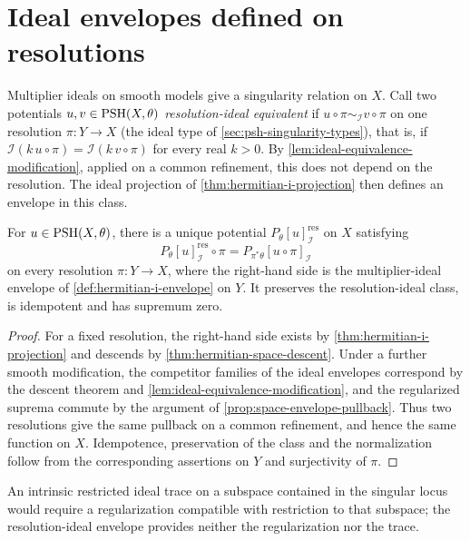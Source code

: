 \section{Ideal envelopes defined on resolutions}

Multiplier ideals on smooth models give a singularity relation on $X$. Call two potentials $u,v\in\mathrm{PSH}(X,\theta)$ \emph{resolution-ideal equivalent} if $u\circ\pi\sim_{\mathcal I}v\circ\pi$ on one resolution $\pi\colon Y\to X$ (the ideal type of \cref{sec:psh-singularity-types}), that is, if $\mathcal I(k\,u\circ\pi)=\mathcal I(k\,v\circ\pi)$ for every real $k>0$. By \cref{lem:ideal-equivalence-modification}, applied on a common refinement, this does not depend on the resolution. The ideal projection of \cref{thm:hermitian-i-projection} then defines an envelope in this class.

\begin{proposition}\label{prop:space-resolution-i-envelope}
For $u\in\mathrm{PSH}(X,\theta)$, there is a unique potential $P_\theta[u]_{\mathcal I}^{\mathrm{res}}$ on $X$ satisfying
\[
 P_\theta[u]_{\mathcal I}^{\mathrm{res}}\circ\pi
       =P_{\pi^*\theta}[u\circ\pi]_{\mathcal I}
\]
on every resolution $\pi\colon Y\to X$, where the right-hand side is the multiplier-ideal envelope of \cref{def:hermitian-i-envelope} on $Y$. It preserves the resolution-ideal class, is idempotent and has supremum zero.
\end{proposition}
\begin{proof}
For a fixed resolution, the right-hand side exists by \cref{thm:hermitian-i-projection} and descends by \cref{thm:hermitian-space-descent}. Under a further smooth modification, the competitor families of the ideal envelopes correspond by the descent theorem and \cref{lem:ideal-equivalence-modification}, and the regularized suprema commute by the argument of \cref{prop:space-envelope-pullback}. Thus two resolutions give the same pullback on a common refinement, and hence the same function on $X$. Idempotence, preservation of the class and the normalization follow from the corresponding assertions on $Y$ and surjectivity of $\pi$.
\end{proof}

An intrinsic restricted ideal trace on a subspace contained in the singular locus would require a regularization compatible with restriction to that subspace; the resolution-ideal envelope provides neither the regularization nor the trace.

